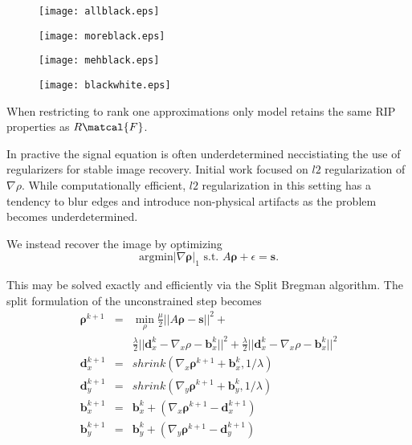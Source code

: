 \documentclass[11pt]{amsart}
\theoremstyle{remark}
\begin{document}
\begin{figure}
\texttt{[image: allblack.eps]}
\end{figure}

\begin{figure}
\texttt{[image: moreblack.eps]}
\end{figure}

\begin{figure}
\texttt{[image: mehblack.eps]}
\end{figure}


\begin{figure}
\texttt{[image: blackwhite.eps]}
\end{figure}


When restricting to rank one approximations only model retains the
same RIP properties as $R\matcal{F}$.

In practive the signal equation is often underdetermined neccistiating the use of
regularizers for stable image recovery. Initial work focused on $l2$
regularization of $\nabla \rho$. While computationally efficient, $l2$
regularization in this setting has a tendency to blur edges and
introduce non-physical artifacts as the problem becomes underdetermined.

We instead recover the image by optimizing
\begin{equation}
\text{argmin} |\nabla \mathbf{\rho}|_1 \text{ s.t. } A\mathbf{\rho} +
\epsilon = \mathbf{s}.
\end{equation}

This may be solved exactly and efficiently via the Split Bregman
algorithm. The split formulation of the unconstrained step becomes
\begin{eqnarray}\label{sb}
\mathbf{\rho}^{k+1} &=& \min_\rho \frac{\mu}{2}||A\mathbf{\rho} - \mathbf{s}||^2 +\\
&& \frac{\lambda}{2}||\mathbf{d}_x^k - \nabla_x\rho - \mathbf{b}_x^k||^2 +  \frac{\lambda}{2}||\mathbf{d}_x^k - \nabla_x\rho - \mathbf{b}_x^k||^2 \\
\mathbf{d}_x^{k+1} &=& shrink(\nabla_x \mathbf{\rho}^{k+1} + \mathbf{b}_x^k, 1/\lambda)\\
\mathbf{d}_y^{k+1} &=& shrink(\nabla_y \mathbf{\rho}^{k+1} + \mathbf{b}_y^k, 1/\lambda)\\
\mathbf{b}_x^{k+1} &=& \mathbf{b}_x^{k} + (\nabla_x \mathbf{\rho}^{k+1} - \mathbf{d}_x^{k+1}) \\
\mathbf{b}_y^{k+1} &=& \mathbf{b}_y^{k} + (\nabla_y \mathbf{\rho}^{k+1} - \mathbf{d}_y^{k+1})
\end{eqnarray}
\end{document}
